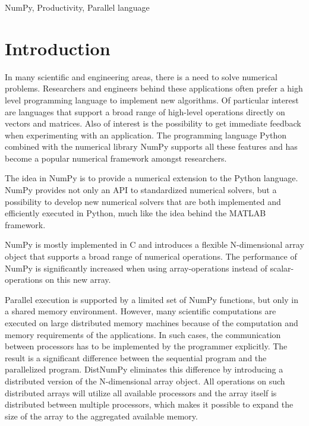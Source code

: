 \documentclass{sigplanconf}
\begin{document}
\keywords
NumPy, Productivity, Parallel language

\section{Introduction}
In many scientific and engineering areas, there is a need to solve numerical problems. Researchers and engineers behind these applications often prefer a high level programming language to implement new algorithms. Of particular interest are languages that support a broad range of high-level operations directly on vectors and matrices. Also of interest is the possibility to get immediate feedback when experimenting with an application. The programming language Python combined with the numerical library NumPy\cite{numpy} supports all these features and has become a popular numerical framework amongst researchers. 

The idea in NumPy is to provide a numerical extension to the Python language. NumPy provides not only an API to standardized numerical solvers, but a possibility to develop new numerical solvers that are both implemented and efficiently executed in Python, much like the idea behind the MATLAB\cite{guide1998mathworks} framework. 

NumPy is mostly implemented in C and introduces a flexible N-dimensional array object that supports a broad range of numerical operations. The performance of NumPy is significantly increased when using array-operations instead of scalar-operations on this new array.

Parallel execution is supported by a limited set of NumPy functions, but only in a shared memory environment. However, many scientific computations are executed on large distributed memory machines because of the computation and memory requirements of the applications. In such cases, the communication between processors has to be implemented by the programmer explicitly. The result is a significant difference between the sequential program and the parallelized program. DistNumPy eliminates this difference by introducing a distributed version of the N-dimensional array object. All operations on such distributed arrays will utilize all available processors and the array itself is distributed between multiple processors, which makes it possible to expand the size of the array to the aggregated available memory.
\end{document}
